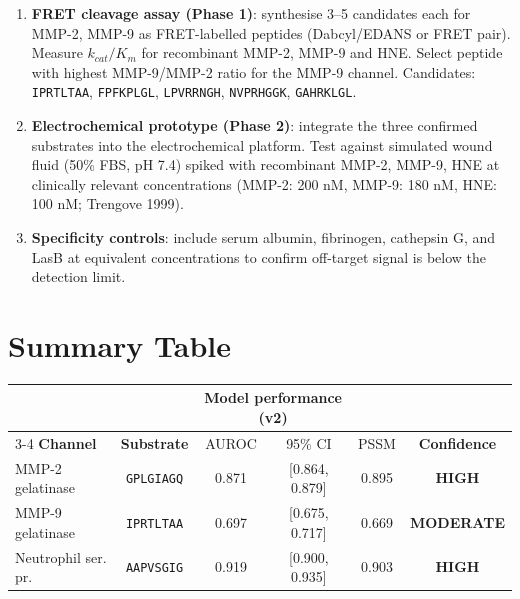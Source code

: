 \documentclass[10pt,a4paper]{article}
\newcommand{\seq}[1]{\texttt{#1}}
\begin{document}
\begin{enumerate}[leftmargin=*,topsep=2pt,itemsep=2pt]
  \item \textbf{FRET cleavage assay (Phase 1)}: synthesise 3--5 candidates
    each for MMP-2, MMP-9 as FRET-labelled peptides (Dabcyl/EDANS or FRET
    pair).  Measure $k_{cat}/K_m$ for recombinant MMP-2, MMP-9 and HNE.
    Select peptide with highest MMP-9/MMP-2 ratio for the MMP-9 channel.
    Candidates: \seq{IPRTLTAA}, \seq{FPFKPLGL}, \seq{LPVRRNGH},
    \seq{NVPRHGGK}, \seq{GAHRKLGL}.

  \item \textbf{Electrochemical prototype (Phase 2)}: integrate the three
    confirmed substrates into the electrochemical platform.  Test against
    simulated wound fluid (50\% FBS, pH 7.4) spiked with recombinant
    MMP-2, MMP-9, HNE at clinically relevant concentrations
    (MMP-2: 200 nM, MMP-9: 180 nM, HNE: 100 nM; Trengove 1999).

  \item \textbf{Specificity controls}: include serum albumin, fibrinogen,
    cathepsin G, and LasB at equivalent concentrations to confirm
    off-target signal is below the detection limit.
\end{enumerate}

\section{Summary Table}

\begin{center}
\small
\begin{tabular}{lccccc}
  \toprule
  & & \multicolumn{2}{c}{\textbf{Model performance (v2)}} & & \\
  \cmidrule(lr){3-4}
  \textbf{Channel} & \textbf{Substrate} & AUROC & 95\% CI & PSSM & \textbf{Confidence}\\
  \midrule
  MMP-2 gelatinase    & \seq{GPLGIAGQ} & 0.871 & [0.864, 0.879] & 0.895 & \textcolor{highgreen}{\textbf{HIGH}}\\
  MMP-9 gelatinase    & \seq{IPRTLTAA} & 0.697 & [0.675, 0.717] & 0.669 & \textcolor{midamber}{\textbf{MODERATE}}\\
  Neutrophil ser. pr. & \seq{AAPVSGIG} & 0.919 & [0.900, 0.935] & 0.903 & \textcolor{highgreen}{\textbf{HIGH}}\\
  \bottomrule
\end{tabular}
\end{center}
\end{document}
